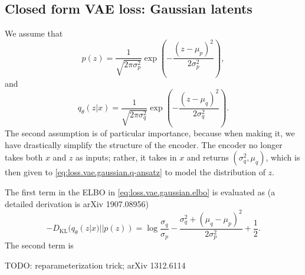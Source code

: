 \documentclass[hyperref, a4paper, 12pt]{report}
\begin{document}
\subsection{Closed form VAE loss: Gaussian latents}

We assume that 
\begin{equation}
    p(z) = \frac{1}{\sqrt{2\pi \sigma_p^2}} \exp(- \frac{(z - \mu_p)^2}{2 \sigma_p^2}),
\end{equation} 
and 
\begin{equation}
    q_\theta(z | x) = \frac{1}{\sqrt{2\pi \sigma_q^2}} \exp(- \frac{(z - \mu_q)^2}{2 \sigma_q^2}).
    \label{eq:loss.vae.gaussian.q-ansatz}
\end{equation}
The second assumption is of particular importance,
because when making it, we have drastically simplify the structure of the encoder.
The encoder no longer takes both $x$ and $z$ as inputs;
rather, it takes in $x$ and returns $(\sigma_q^2, \mu_q)$,
which is then given to \eqref{eq:loss.vae.gaussian.q-ansatz} to model the distribution of $z$.

The first term in the ELBO in \eqref{eq:loss.vae.gaussian.elbo} is evaluated as (a detailed derivation is arXiv 1907.08956)
\begin{equation}
    - D_{\text{KL}}(q_\theta(z|x) || p(z)) = \log \frac{\sigma_q}{\sigma_p} - \frac{\sigma_q^2 + (\mu_q - \mu_p)^2}{2 \sigma_p^2} + \frac{1}{2}.
\end{equation}
The second term is 

TODO: reparameterization trick; arXiv 1312.6114

\printbibliography[title=References]
\end{document}
